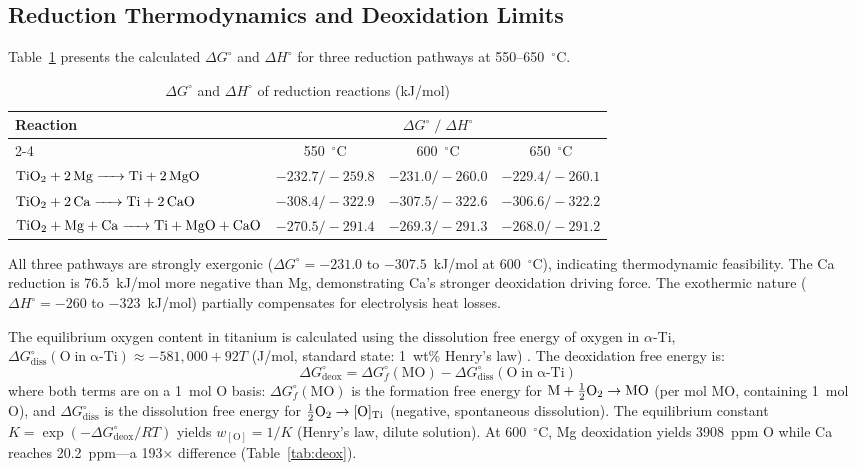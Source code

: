 \documentclass[11pt]{article}
\begin{document}
\subsection*{Reduction Thermodynamics and Deoxidation Limits}

Table~\ref{tab:thermo} presents the calculated $\Delta G^{\circ}$ and $\Delta H^{\circ}$ for three reduction pathways at 550--650~$^{\circ}$C.

\begin{table}[!ht]
\centering
\footnotesize
\caption{$\Delta G^{\circ}$ and $\Delta H^{\circ}$ of reduction reactions (kJ/mol)}
\label{tab:thermo}
\begin{tabular}{lccc}
\toprule
\multirow{2}{*}{Reaction} & \multicolumn{3}{c}{$\Delta G^{\circ}\;/\;\Delta H^{\circ}$} \\
\cmidrule(lr){2-4}
 & 550~$^{\circ}$C & 600~$^{\circ}$C & 650~$^{\circ}$C \\
\midrule
$\ce{TiO2 + 2Mg -> Ti + 2MgO}$ & $-232.7/-259.8$ & $-231.0/-260.0$ & $-229.4/-260.1$ \\
$\ce{TiO2 + 2Ca -> Ti + 2CaO}$ & $-308.4/-322.9$ & $-307.5/-322.6$ & $-306.6/-322.2$ \\
$\ce{TiO2 + Mg + Ca -> Ti + MgO + CaO}$ & $-270.5/-291.4$ & $-269.3/-291.3$ & $-268.0/-291.2$ \\
\bottomrule
\end{tabular}
\end{table}

All three pathways are strongly exergonic ($\Delta G^{\circ} = -231.0$ to $-307.5$~kJ/mol at 600~$^{\circ}$C), indicating thermodynamic feasibility. The Ca reduction is 76.5~kJ/mol more negative than Mg, demonstrating Ca's stronger deoxidation driving force. The exothermic nature ($\Delta H^{\circ} = -260$ to $-323$~kJ/mol) partially compensates for electrolysis heat losses.

The equilibrium oxygen content in titanium is calculated using the dissolution free energy of oxygen in $\alpha$-Ti, $\Delta G^{\circ}_{\mathrm{diss}}(\mathrm{O\;in\;\alpha\text{-}Ti}) \approx -581{,}000 + 92T$ (J/mol, standard state: 1~wt\% Henry's law) \cite{waldner1999}. The deoxidation free energy is:
\begin{equation}
\label{eq:deox}
\Delta G^{\circ}_{\mathrm{deox}} = \Delta G^{\circ}_{f}(\mathrm{MO}) - \Delta G^{\circ}_{\mathrm{diss}}(\mathrm{O\;in\;\alpha\text{-}Ti})
\end{equation}
where both terms are on a 1~mol O basis: $\Delta G^{\circ}_{f}(\mathrm{MO})$ is the formation free energy for $\mathrm{M} + \tfrac{1}{2}\ce{O2} \to \mathrm{MO}$ (per mol MO, containing 1~mol O), and $\Delta G^{\circ}_{\mathrm{diss}}$ is the dissolution free energy for $\tfrac{1}{2}\ce{O2} \to [\mathrm{O}]_{\mathrm{Ti}}$ (negative, spontaneous dissolution).
The equilibrium constant $K = \exp(-\Delta G^{\circ}_{\mathrm{deox}}/RT)$ yields $w_{[\mathrm{O}]} = 1/K$ (Henry's law, dilute solution). At 600~$^{\circ}$C, Mg deoxidation yields 3908~ppm O while Ca reaches 20.2~ppm---a 193$\times$ difference (Table~\ref{tab:deox}).
\end{document}
